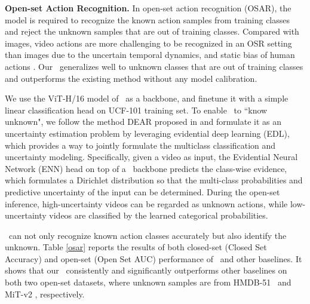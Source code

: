\textbf{Open-set Action Recognition.}
In open-set action recognition (OSAR), the model is required to recognize the known action samples from training classes and reject the unknown samples that are out of training classes. 
Compared with images, video actions are more challenging to be recognized in an OSR setting than images due to the uncertain temporal dynamics, and static bias of human actions \cite{bao2021evidential}. Our \model~generalizes well to unknown classes that are out of training classes and outperforms the existing method \cite{bao2021evidential} without any model calibration.


We use the ViT-H/16 model of \model~as a backbone, and finetune it with a simple linear classification head on UCF-101 \cite{soomro2012dataset} training set. To enable \model~to ``know unknown", we follow the method DEAR proposed in \cite{bao2021evidential} and formulate it as an uncertainty estimation problem by leveraging evidential deep learning (EDL), which provides a way to jointly formulate the multiclass classification and uncertainty modeling. Specifically, given a video as input, the Evidential Neural Network (ENN) head on top of a \model~backbone predicts the class-wise evidence, which formulates a Dirichlet distribution so that the multi-class probabilities and predictive uncertainty of the input can be determined. During the open-set inference, high-uncertainty videos can be regarded as unknown actions, while low-uncertainty videos are classified by the learned categorical probabilities. 

\model~can not only recognize known action classes accurately but also identify the unknown. Table \ref{osar} reports the results of both closed-set (Closed Set Accuracy) and open-set (Open Set AUC) performance of \model~and other baselines. It shows that our \model~consistently and significantly outperforms other baselines on both two open-set datasets, where unknown samples are from HMDB-51~\cite{hmdb51} and MiT-v2 \cite{monfort2021multi}, respectively.
